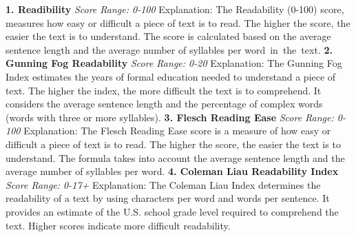 \documentclass[table,french,english]{rapportCS}
\begin{document}
{\small 
\textbf{1. Readibility}\newline
\textit{Score Range: 0-100}\newline
Explanation: The Readability (0-100) score, measures how easy or difficult a piece of text is to read. The higher the score, the easier the text is to understand. The score is calculated based on the average sentence length and the average number of syllables per word in the text.
\textbf{}\newline
\textbf{2. Gunning Fog Readability}\newline
\textit{Score Range: 0-20}\newline
Explanation: The Gunning Fog Index estimates the years of formal education needed to understand a piece of text. The higher the index, the more difficult the text is to comprehend. It considers the average sentence length and the percentage of complex words (words with three or more syllables).
\textbf{}\newline
\textbf{3. Flesch Reading Ease}\newline
\textit{Score Range: 0-100}\newline
Explanation: The Flesch Reading Ease score is a measure of how easy or difficult a piece of text is to read. The higher the score, the easier the text is to understand. The formula takes into account the average sentence length and the average number of syllables per word.
\textbf{}\newline
\textbf{4. Coleman Liau Readability Index}\newline
\textit{Score Range: 0-17+}\newline
Explanation: The Coleman Liau Index determines the readability of a text by using characters per word and words per sentence. It provides an estimate of the U.S. school grade level required to comprehend the text. Higher scores indicate more difficult readability.

}
\end{document}
